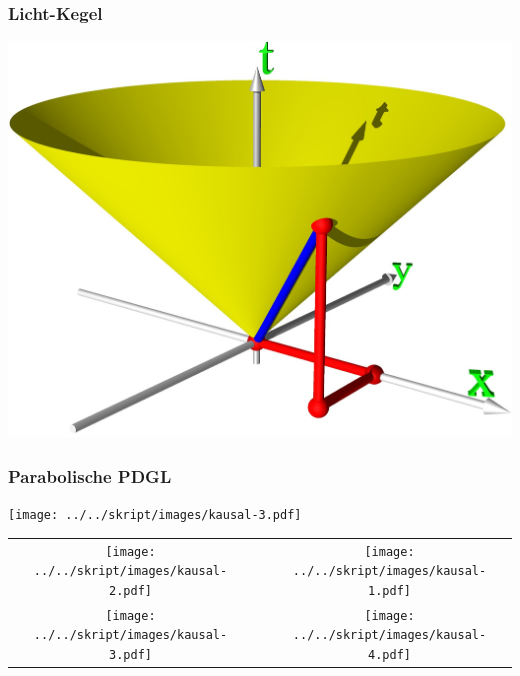 \begin{frame}
\frametitle{Licht-Kegel}
\begin{center}
\includegraphics[width=\hsize]{lichtkegel.jpg}
\end{center}
\end{frame}

\begin{frame}
\frametitle{Parabolische PDGL}
\begin{center}
\texttt{[image: ../../skript/images/kausal-3.pdf]}
\end{center}
\end{frame}

\begin{frame}
\begin{center}
\begin{tabular}{ccc}
\texttt{[image: ../../skript/images/kausal-2.pdf]}&&
\texttt{[image: ../../skript/images/kausal-1.pdf]}\\
\texttt{[image: ../../skript/images/kausal-3.pdf]}&&
\texttt{[image: ../../skript/images/kausal-4.pdf]}
\end{tabular}
\end{center}
\end{frame}
